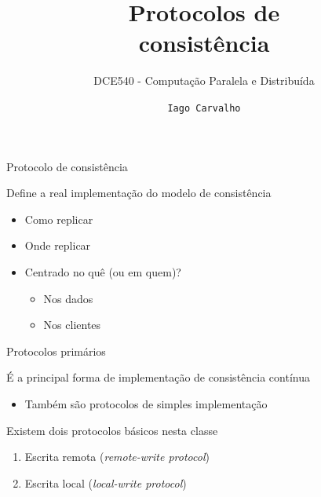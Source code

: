 \documentclass[compress]{beamer}
\title{Protocolos de \\ consistência}
\subtitle{DCE540 - Computação Paralela e Distribuída}
\author{\texttt{Iago Carvalho}}
\institute{\texttt{Departamento de Ciência da Computação}}
\begin{document}
\begin{frame}
\titlepage

\end{frame}


\begin{frame}{Protocolo de consistência}

Define a real implementação do modelo de consistência
\begin{itemize}
    \item Como replicar
    \item Onde replicar
    \item Centrado no quê (ou em quem)?
    \begin{itemize}
        \item Nos dados
        \item Nos clientes
    \end{itemize}
\end{itemize}

\end{frame}


\begin{frame}{Protocolos primários}

É a principal forma de implementação de consistência contínua
\begin{itemize}
    \item Também são protocolos de simples implementação
\end{itemize}

\vspace{0.5cm}

Existem dois protocolos básicos nesta classe
\begin{enumerate}
    \item Escrita remota (\textit{remote-write protocol})
    \item Escrita local (\textit{local-write protocol})
\end{enumerate}
\end{frame}

\end{document}
